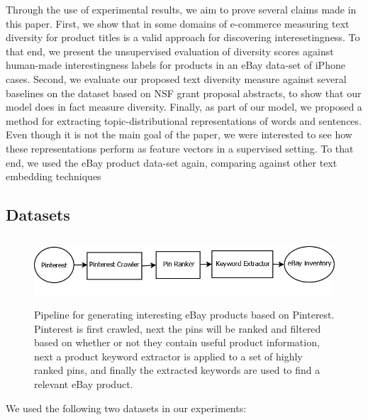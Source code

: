Through the use of experimental results, we aim to prove several
claims made in this paper. First, we show that in some domains of
e-commerce measuring text diversity for product titles is a valid
approach for discovering interesetingness. To that end, we present the
unsupervised evaluation of diversity scores against human-made
interestingness labels for products in an eBay data-set of iPhone
cases. Second, we evaluate our proposed text diversity measure against
several baselines on the dataset based on NSF grant proposal
abstracts, to show that our model does in fact measure
diversity. Finally, as part of our model, we proposed a method for
extracting topic-distributional representations of words and
sentences. Even though it is not the main goal of the paper, we were
interested to see how these representations perform as feature vectors
in a supervised setting. To that end, we used the eBay product
data-set again, comparing against other text embedding techniques
\subsection{Datasets}
\label{sec:datasets}


\begin{figure}
\begin{center}
\includegraphics[height=2.5cm]{figures/Pipeline.png}
\caption{Pipeline for generating interesting eBay products based on Pinterest. Pinterest is first crawled, next the pins will be ranked and filtered based on whether or not they contain useful product information, next a product keyword extractor is applied to a set of highly ranked pins, and finally the extracted keywords are used to find a relevant eBay product.}
\end{center}
\label{fig:pinterest-pipeline}
\end{figure}

We used the following two datasets in our experiments: 

